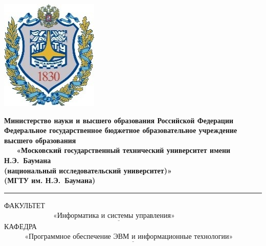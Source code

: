 \documentclass[14pt]{extreport}
\begin{document}
	\thispagestyle{empty}
	\begin{titlepage}
		\noindent \begin{minipage}{0.15\textwidth}
			\includegraphics[width=\linewidth]{b_logo}
		\end{minipage}
		\noindent\begin{minipage}{0.9\textwidth}\centering
			\textbf{Министерство науки и высшего образования Российской Федерации}\\
			\textbf{Федеральное государственное бюджетное образовательное учреждение высшего образования}\\
			\textbf{~~~«Московский государственный технический университет имени Н.Э.~Баумана}\\
			\textbf{(национальный исследовательский университет)»}\\
			\textbf{(МГТУ им. Н.Э.~Баумана)}
		\end{minipage}
		
		\noindent\rule{18cm}{3pt}
		\newline\newline
		\noindent ФАКУЛЬТЕТ $\underline{~~~~~~~~~~~~~~~~~~~~~~~~~~~~~~~\text{«Информатика и системы управления»}~~~~~~~~~~~~~~~~~~~~~~~~~~~~~~~~~~~~~}$ \newline\newline
		\noindent КАФЕДРА $\underline{~~~~~~~~~~~~~\text{«Программное обеспечение ЭВМ и информационные технологии»}~~~~~~~~~~~~~~~~~~~~~~~}$\newline\newline\newline\newline\newline\newline
		

\end{titlepage}
\end{document}
